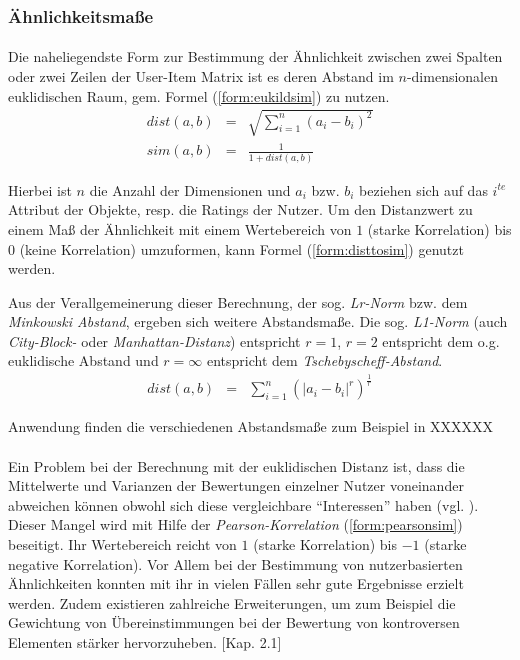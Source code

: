 \subsubsection{Ähnlichkeitsmaße}

\paragraph{} Die naheliegendste Form zur Bestimmung der Ähnlichkeit zwischen zwei Spalten oder zwei Zeilen der User-Item Matrix ist es deren Abstand im $n$-dimensionalen euklidischen Raum, gem. Formel (\ref{form:eukildsim}) zu nutzen.
\begin{eqnarray}
\label{form:eukildsim}
dist(a,b) & = & \sqrt{\sum_{i=1}^{n} (a_i - b_i)^2} \\
sim(a,b) & = & \frac{1}{1+dist(a,b)} \label{form:disttosim}
\end{eqnarray}

Hierbei ist $n$ die Anzahl der Dimensionen und $a_i$ bzw. $b_i$ beziehen sich auf das  $i^{te}$ Attribut der Objekte, resp. die Ratings der Nutzer. Um den Distanzwert zu einem Maß der Ähnlichkeit mit einem Wertebereich von $1$ (starke Korrelation) bis $0$ (keine Korrelation) umzuformen, kann Formel (\ref{form:disttosim}) genutzt werden.

Aus der Verallgemeinerung dieser Berechnung, der sog. \textit{Lr-Norm} bzw. dem \textit{Minkowski Abstand}, ergeben sich weitere Abstandsmaße. Die sog. \textit{L1-Norm} (auch \textit{City-Block-} oder \textit{Manhattan-Distanz}) entspricht $r=1$, $r=2$ entspricht dem o.g. euklidische Abstand und $ r=\infty $ entspricht dem \textit{Tschebyscheff-Abstand}. \citep{hb_02}
\begin{eqnarray}
\label{form:cityblocksim}\label{form:minkowskisim}
dist(a,b) & = & \sum_{i=1}^{n} (\left| a_i - b_i \right|^r)^\frac{1}{r}
\end{eqnarray}

Anwendung finden die verschiedenen Abstandsmaße zum Beispiel in XXXXXX 

\paragraph{} Ein Problem bei der Berechnung mit der euklidischen Distanz ist, dass die Mittelwerte und Varianzen der Bewertungen einzelner Nutzer voneinander abweichen können obwohl sich diese vergleichbare ``Interessen'' haben (vgl. \citep[Kap. 2]{pci}). Dieser Mangel wird mit Hilfe der \textit{Pearson-Korrelation} (\ref{form:pearsonsim}) beseitigt.  Ihr Wertebereich reicht von $1$ (starke Korrelation) bis $-1$ (starke negative Korrelation). Vor Allem bei der Bestimmung von nutzerbasierten Ähnlichkeiten konnten mit ihr in vielen Fällen sehr gute Ergebnisse erzielt werden. Zudem existieren zahlreiche Erweiterungen, um zum Beispiel die Gewichtung von Übereinstimmungen bei der Bewertung von kontroversen Elementen stärker hervorzuheben. \citep{rs}[Kap. 2.1] \citep{hb_02}


